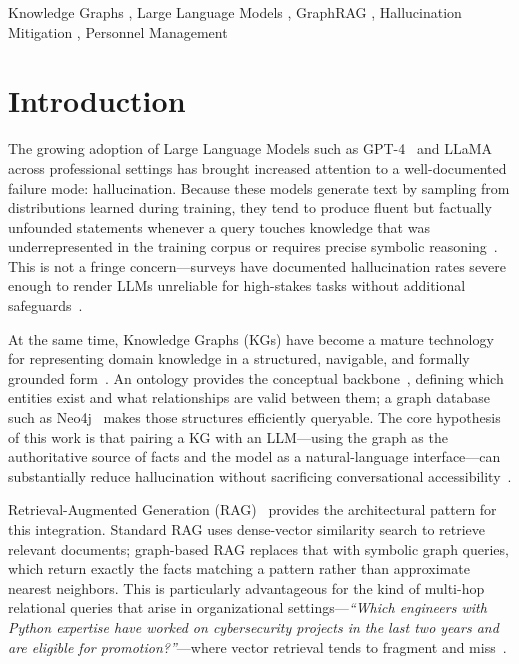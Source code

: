 \documentclass{ceurart}
\begin{document}
\begin{keywords}
  Knowledge Graphs \sep
  Large Language Models \sep
  GraphRAG \sep
  Hallucination Mitigation \sep
  Personnel Management
\end{keywords}

\maketitle

\section{Introduction}

The growing adoption of Large Language Models such as
GPT-4~\cite{openai2023gpt4} and LLaMA~\cite{touvron2023llama} across
professional settings has brought increased attention to a well-documented
failure mode: hallucination. Because these models generate text by sampling
from distributions learned during training, they tend to produce fluent but
factually unfounded statements whenever a query touches knowledge that was
underrepresented in the training corpus or requires precise symbolic
reasoning~\cite{mallen2023trustlanguagemodelsinvestigating,
huang2023reasoninglargelanguagemodels}. This is not a fringe
concern---surveys have documented hallucination rates severe enough to render
LLMs unreliable for high-stakes tasks without additional
safeguards~\cite{agrawal2024knowledgegraphsreducehallucinations}.

At the same time, Knowledge Graphs (KGs) have become a mature technology for
representing domain knowledge in a structured, navigable, and formally grounded
form~\cite{hogan2021knowledge}. An ontology provides the conceptual
backbone~\cite{GRUBER1993199}, defining which entities exist and what
relationships are valid between them; a graph database such as
Neo4j~\cite{Neo4j2024} makes those structures efficiently queryable. The core
hypothesis of this work is that pairing a KG with an LLM---using the graph as
the authoritative source of facts and the model as a natural-language
interface---can substantially reduce hallucination without sacrificing
conversational accessibility~\cite{agrawal2024knowledgegraphsreducehallucinations,
UnifyingLLMandKG}.

Retrieval-Augmented Generation (RAG)~\cite{lewis2021retrievalaugmentedgenerationknowledgeintensivenlp}
provides the architectural pattern for this integration. Standard RAG uses
dense-vector similarity search to retrieve relevant documents; graph-based RAG
replaces that with symbolic graph queries, which return exactly the facts
matching a pattern rather than approximate nearest neighbors. This is
particularly advantageous for the kind of multi-hop relational queries that
arise in organizational settings---\textit{``Which engineers with Python expertise
have worked on cybersecurity projects in the last two years and are eligible for
promotion?''}---where vector retrieval tends to fragment and
miss~\cite{edge2025localglobalgraphrag, gao2024retrievalaugmentedgenerationlargelanguage}.
\end{document}
